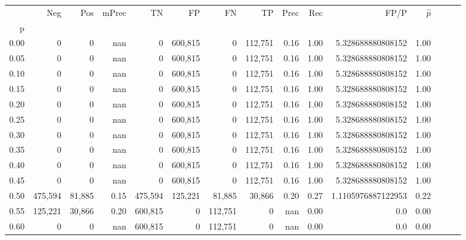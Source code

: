 \begin{tabular}{rrrrrrrrrrrrrrr}
\toprule
{} &      Neg &     Pos & mPrec &       TN &       FP &       FN &       TP &  Prec &   Rec &                FP/P & $\hat{p}$ \\
p    &          &         &       &          &          &          &          &       &       &                     &           \\
\midrule
0.00 &        0 &       0 &   nan &        0 &  600,815 &        0 &  112,751 &  0.16 &  1.00 &   5.328688880808152 &      1.00 \\
0.05 &        0 &       0 &   nan &        0 &  600,815 &        0 &  112,751 &  0.16 &  1.00 &   5.328688880808152 &      1.00 \\
0.10 &        0 &       0 &   nan &        0 &  600,815 &        0 &  112,751 &  0.16 &  1.00 &   5.328688880808152 &      1.00 \\
0.15 &        0 &       0 &   nan &        0 &  600,815 &        0 &  112,751 &  0.16 &  1.00 &   5.328688880808152 &      1.00 \\
0.20 &        0 &       0 &   nan &        0 &  600,815 &        0 &  112,751 &  0.16 &  1.00 &   5.328688880808152 &      1.00 \\
0.25 &        0 &       0 &   nan &        0 &  600,815 &        0 &  112,751 &  0.16 &  1.00 &   5.328688880808152 &      1.00 \\
0.30 &        0 &       0 &   nan &        0 &  600,815 &        0 &  112,751 &  0.16 &  1.00 &   5.328688880808152 &      1.00 \\
0.35 &        0 &       0 &   nan &        0 &  600,815 &        0 &  112,751 &  0.16 &  1.00 &   5.328688880808152 &      1.00 \\
0.40 &        0 &       0 &   nan &        0 &  600,815 &        0 &  112,751 &  0.16 &  1.00 &   5.328688880808152 &      1.00 \\
0.45 &        0 &       0 &   nan &        0 &  600,815 &        0 &  112,751 &  0.16 &  1.00 &   5.328688880808152 &      1.00 \\
0.50 &  475,594 &  81,885 &  0.15 &  475,594 &  125,221 &   81,885 &   30,866 &  0.20 &  0.27 &  1.1105976887122953 &      0.22 \\
0.55 &  125,221 &  30,866 &  0.20 &  600,815 &        0 &  112,751 &        0 &   nan &  0.00 &                 0.0 &      0.00 \\
0.60 &        0 &       0 &   nan &  600,815 &        0 &  112,751 &        0 &   nan &  0.00 &                 0.0 &      0.00 \\

\end{tabular}
